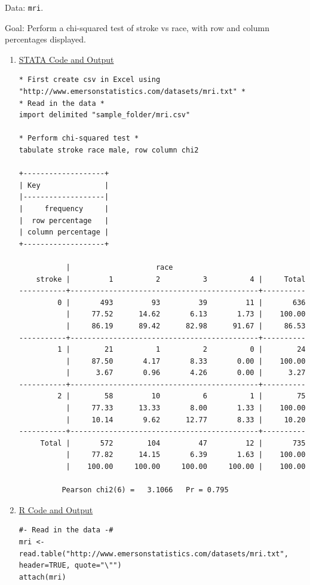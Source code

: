 \documentclass[11pt,letterpaper,fleqn]{report}
\begin{document}
Data: \texttt{mri}.

Goal: Perform a chi-squared test of stroke vs race, with row and column percentages displayed.

\begin{enumerate}[]
\item \underline{STATA Code and Output}
{\scriptsize
\begin{verbatim}
* First create csv in Excel using "http://www.emersonstatistics.com/datasets/mri.txt" *
* Read in the data *
import delimited "sample_folder/mri.csv"

* Perform chi-squared test *
tabulate stroke race male, row column chi2

+-------------------+
| Key               |
|-------------------|
|     frequency     |
|  row percentage   |
| column percentage |
+-------------------+

           |                    race
    stroke |         1          2          3          4 |     Total
-----------+--------------------------------------------+----------
         0 |       493         93         39         11 |       636 
           |     77.52      14.62       6.13       1.73 |    100.00 
           |     86.19      89.42      82.98      91.67 |     86.53 
-----------+--------------------------------------------+----------
         1 |        21          1          2          0 |        24 
           |     87.50       4.17       8.33       0.00 |    100.00 
           |      3.67       0.96       4.26       0.00 |      3.27 
-----------+--------------------------------------------+----------
         2 |        58         10          6          1 |        75 
           |     77.33      13.33       8.00       1.33 |    100.00 
           |     10.14       9.62      12.77       8.33 |     10.20 
-----------+--------------------------------------------+----------
     Total |       572        104         47         12 |       735 
           |     77.82      14.15       6.39       1.63 |    100.00 
           |    100.00     100.00     100.00     100.00 |    100.00 

          Pearson chi2(6) =   3.1066   Pr = 0.795

\end{verbatim}}


\item \underline{R Code and Output}
{\scriptsize
\begin{verbatim}
#- Read in the data -#
mri <- read.table("http://www.emersonstatistics.com/datasets/mri.txt", header=TRUE, quote="\"")
attach(mri)


\end{verbatim}}
\end{enumerate}
\end{document}
